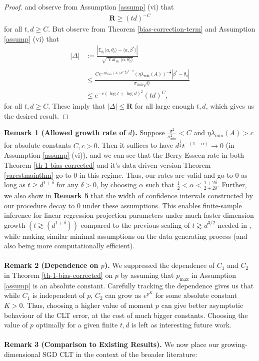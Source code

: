 \documentclass[11pt, reqno,english]{amsart}
\DeclareMathOperator{\Var}{Var} \DeclareMathOperator{\N}{N}
\begin{document}
\begin{proof}
and observe from Assumption \ref{assump} (vi) that
\begin{align*}
\mathbf{R} \geq (td)^{-C}
\end{align*}
for all $t,d \geq C$. But observe from Theorem \ref{bias-correction-term} and Assumption \ref{assump} (vi) that
\begin{align*}
|\Delta| &:= \frac{|\mathbb{E}_{\theta_t} \langle a, \theta_t \rangle - \langle a, \beta^* \rangle|}{\sqrt{\Var_{\theta_t} \langle a, \theta_t \rangle}}
\\
\\
&\leq \frac{Ce^{-\eta \lambda_{\min}(A)d^{-\frac{1}{2}}t^{1-\alpha}}(\eta \lambda_{\min}(A))^{-\frac{1}{2}}|\beta^* - \theta_0|}{\sigma_{\min}\sqrt{\eta}}
\\
&\leq e^{-c (\log t + \log d)^2}(td)^C,
\end{align*}
for all $t,d \geq C$. These imply that $|\Delta| \leq \mathbf{R}$ for all large enough $t,d$, which gives us the desired result.
\end{proof}
\noindent \textbf{Remark 1 (Allowed growth rate of $d$).} Suppose $\frac{\sigma^2}{\sigma^2_{\min}} < C$ and $\eta \lambda_{\min}(A) > c$ for absolute constants $C,c > 0$. Then it suffices to have $d^{\frac{1}{2}}t^{-(1-\alpha)} \to 0$ (in Assumption \ref{assump} (vi)), and we can see that the Berry Esseen rate in both Theorem \ref{th-1-bias-corrected} and it's data-driven version Theorem \ref{varestmainthm} go to $0$ in this regime. Thus, our rates are valid and go to $0$ as long as $t \geq d^{1+\delta}$ for any $\delta > 0$, by choosing $\alpha$ such that $\frac{1}{2} < \alpha < \frac{1 + 2\delta}{2 + 2\delta}$. Further, we also show in \textbf{Remark 5} that the width of confidence intervals constructed by our procedure decay to $0$ under these assumptions. This enables finite-sample inference for linear regression projection parameters under much faster dimension growth $(t \gtrsim (d^{1+\delta}))$ compared to the previous scaling of $t \gtrsim d^{3/2}$ needed in \cite{chang2023inference}, while making similar minimal assumptions on the data generating process (and also being more computationally efficient). 
\\\\
\noindent \textbf{Remark 2 (Dependence on $p$).} We suppressed the dependence of $C_1$ and $C_2$ in Theorem \ref{th-1-bias-corrected} on $p$ by assuming that $p_{\max}$ in Assumption \ref{assump} is an absolute constant. Carefully tracking the dependence gives us that while $C_1$ is independent of $p$, $C_2$ can grow as $e^{p^K}$ for some absolute constant $K > 0$. Thus, choosing a higher value of moment $p$ can give better asymptotic behaviour of the CLT error, at the cost of much bigger constants. Choosing the value of $p$ optimally for a given finite $t,d$ is left as interesting future work.   
\\\\
\noindent \textbf{Remark 3 (Comparison to Existing Results).} We now place our growing-dimensional SGD CLT in the context of the broader literature:
\end{document}
